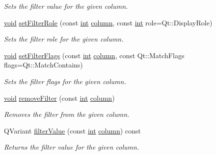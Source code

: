 \begin{DoxyCompactItemize}
\begin{DoxyCompactList}\small\item\em Sets the filter {\itshape value} for the given {\itshape column}. \end{DoxyCompactList}\item 
\hyperlink{group___u_a_v_objects_plugin_ga444cf2ff3f0ecbe028adce838d373f5c}{void} \hyperlink{class_qxt_sort_filter_proxy_model_aabc785fb421ce1edbf9f4f02d3c64138}{set\-Filter\-Role} (const \hyperlink{ioapi_8h_a787fa3cf048117ba7123753c1e74fcd6}{int} \hyperlink{glext_8h_a3b58c39b1b7ca6f4012b27e84de3bdb3}{column}, const \hyperlink{ioapi_8h_a787fa3cf048117ba7123753c1e74fcd6}{int} role=Qt\-::\-Display\-Role)
\begin{DoxyCompactList}\small\item\em Sets the filter {\itshape role} for the given {\itshape column}. \end{DoxyCompactList}\item 
\hyperlink{group___u_a_v_objects_plugin_ga444cf2ff3f0ecbe028adce838d373f5c}{void} \hyperlink{class_qxt_sort_filter_proxy_model_ae4e4542e6964f5921ebeac67b9e31a7c}{set\-Filter\-Flags} (const \hyperlink{ioapi_8h_a787fa3cf048117ba7123753c1e74fcd6}{int} \hyperlink{glext_8h_a3b58c39b1b7ca6f4012b27e84de3bdb3}{column}, const Qt\-::\-Match\-Flags flags=Qt\-::\-Match\-Contains)
\begin{DoxyCompactList}\small\item\em Sets the filter {\itshape flags} for the given {\itshape column}. \end{DoxyCompactList}\item 
\hyperlink{group___u_a_v_objects_plugin_ga444cf2ff3f0ecbe028adce838d373f5c}{void} \hyperlink{class_qxt_sort_filter_proxy_model_aa60c8b0497e71073be692a2a0a9f4fd2}{remove\-Filter} (const \hyperlink{ioapi_8h_a787fa3cf048117ba7123753c1e74fcd6}{int} \hyperlink{glext_8h_a3b58c39b1b7ca6f4012b27e84de3bdb3}{column})
\begin{DoxyCompactList}\small\item\em Removes the filter from the given {\itshape column}. \end{DoxyCompactList}\item 
Q\-Variant \hyperlink{class_qxt_sort_filter_proxy_model_ad8d5631a6c27604771d7160b37089714}{filter\-Value} (const \hyperlink{ioapi_8h_a787fa3cf048117ba7123753c1e74fcd6}{int} \hyperlink{glext_8h_a3b58c39b1b7ca6f4012b27e84de3bdb3}{column}) const 
\begin{DoxyCompactList}\small\item\em Returns the filter value for the given {\itshape column}. \end{DoxyCompactList}\item 

\end{DoxyCompactItemize}
